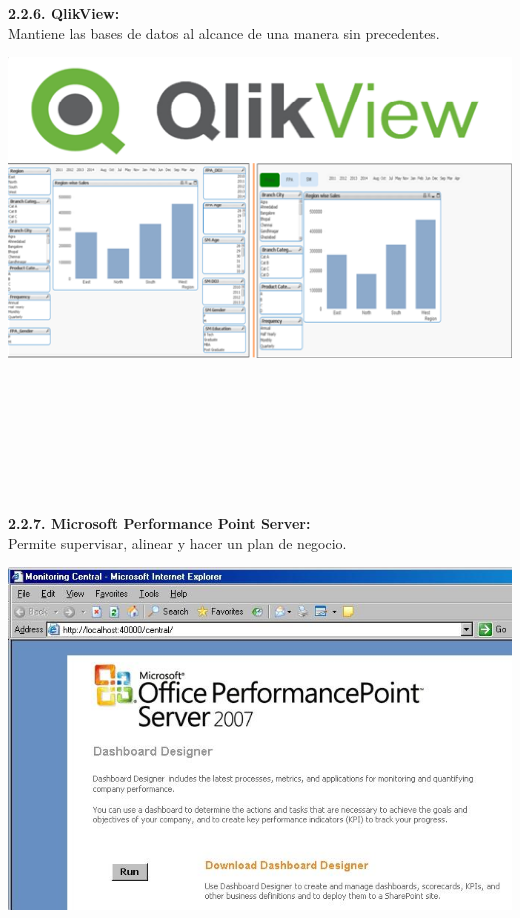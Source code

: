 \begin{flushleft}
\textbf{2.2.6. QlikView: }\\
Mantiene las bases de datos al alcance de una manera sin precedentes.
	\begin{center}
	\includegraphics[width=15cm]{./Imagenes/BIimagen6}
	\end{center}
\textbf{}\\
	\textbf{}\\
\textbf{}\\
\textbf{}\\
\textbf{}\\
\textbf{}\\
\textbf{}\\
\textbf{2.2.7. Microsoft Performance Point Server: }\\
Permite supervisar, alinear y hacer un plan de negocio.
	\begin{center}
	\includegraphics[width=15cm]{./Imagenes/BIimagen7}
	\end{center}
\textbf{}\\
	

\end{flushleft}
